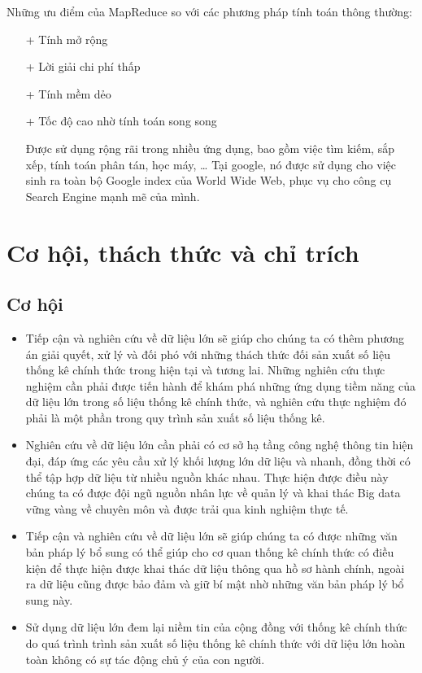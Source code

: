 \documentclass[12pt]{report}
\begin{document}
Những ưu điểm của MapReduce so với các phương pháp tính toán thông thường:
\begin{itemize}
\item[+] Tính mở rộng
\item[+] Lời giải chi phí thấp
\item[+] Tính mềm dẻo
\item[+] Tốc độ cao nhờ tính toán song song

Được sử dụng rộng rãi trong nhiều ứng dụng, bao gồm việc tìm kiếm, sắp xếp, tính toán phân tán, học máy, … Tại google, nó được sử dụng cho việc sinh ra toàn bộ Google index của World Wide Web, phục vụ cho công cụ Search Engine mạnh mẽ của mình.
\end{itemize}

\chapter*{Cơ hội, thách thức và chỉ trích}
\section*{Cơ hội}
\begin{itemize}
\item
Tiếp cận và nghiên cứu về dữ liệu lớn sẽ giúp cho chúng ta có thêm phương án giải quyết, xử lý và đối phó với những thách thức đối sản xuất số liệu thống kê chính thức trong hiện tại và tương lai. Những nghiên cứu thực nghiệm cần phải được tiến hành để khám phá những ứng dụng tiềm năng của dữ liệu lớn trong số liệu thống kê
chính thức, và nghiên cứu thực nghiệm đó phải là một phần trong quy trình sản xuất
số liệu thống kê.
\item
Nghiên cứu về dữ liệu lớn cần phải có cơ sở hạ tầng công nghệ thông tin hiện đại,
đáp ứng các yêu cầu xử lý khối lượng lớn dữ liệu và nhanh, đồng thời có thể tập hợp
dữ liệu từ nhiều nguồn khác nhau. Thực hiện được điều này chúng ta có được đội ngũ
nguồn nhân lực về quản lý và khai thác Big data vững vàng về chuyên môn và được
trải qua kinh nghiệm thực tế.
\item
Tiếp cận và nghiên cứu về dữ liệu lớn sẽ giúp chúng ta có được những văn bản
pháp lý bổ sung có thể giúp cho cơ quan thống kê chính thức có điều kiện để thực
hiện được khai thác dữ liệu thông qua hồ sơ hành chính, ngoài ra dữ liệu cũng được
bảo đảm và giữ bí mật nhờ những văn bản pháp lý bổ sung này.
\item
Sử dụng dữ liệu lớn đem lại niềm tin của cộng đồng với thống kê chính thức do
quá trình trình sản xuất số liệu thống kê chính thức với dữ liệu lớn hoàn toàn không có
sự tác động chủ ý của con người.
\end{itemize}
\end{document}
